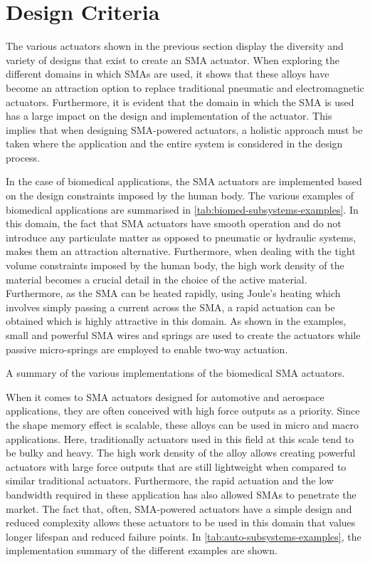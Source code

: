\section{Design Criteria}
The various actuators shown in the previous section display the diversity and variety of designs that exist to create an SMA actuator. When exploring the different domains in which SMAs are used, it shows that these alloys have become an attraction option to replace traditional pneumatic and electromagnetic actuators. Furthermore, it is evident that the domain in which the SMA is used has a large impact on the design and implementation of the actuator. This implies that when designing SMA-powered actuators, a holistic approach must be taken where the application and the entire system is considered in the design process.

In the case of biomedical applications, the SMA actuators are implemented based on the design constraints imposed by the human body. The various examples of biomedical applications are summarised in \cref{tab:biomed-subsystems-examples}. In this domain, the fact that SMA actuators have smooth operation and do not introduce any particulate matter as opposed to pneumatic or hydraulic systems, makes them an attraction alternative. Furthermore, when dealing with the tight volume constraints imposed by the human body, the high work density of the material becomes a crucial detail in the choice of the active material. Furthermore, as the SMA can be heated rapidly, using Joule's heating which involves simply passing a current across the SMA, a rapid actuation can be obtained which is highly attractive in this domain. As shown in the examples, small and powerful SMA wires and springs are used to create the actuators while passive micro-springs are employed to enable two-way actuation.

\begin{table}[hbt]
    \centering
    \caption{A summary of the various implementations of the biomedical SMA actuators.}
    
    \label{tab:biomed-subsystems-examples}
\end{table}

When it comes to SMA actuators designed for automotive and aerospace applications, they are often conceived with high force outputs as a priority. Since the shape memory effect is scalable, these alloys can be used in micro and macro applications. Here, traditionally actuators used in this field at this scale tend to be bulky and heavy. The high work density of the alloy allows creating powerful actuators with large force outputs that are still lightweight when compared to similar traditional actuators. Furthermore, the rapid actuation and the low bandwidth required in these application has also allowed SMAs to penetrate the market. The fact that, often, SMA-powered actuators have a simple design and reduced complexity allows these actuators to be used in this domain that values longer lifespan and reduced failure points. In \cref{tab:auto-subsystems-examples}, the implementation summary of the different examples are shown.

